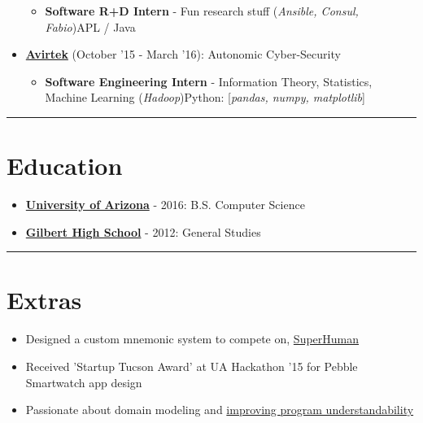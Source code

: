 \documentclass{article}
\begin{document}
\begin{itemize}
\begin{itemize}
\item \textbf{Software R+D Intern} - Fun research stuff (\textit{Ansible, Consul, Fabio})\newline APL / Java
\end{itemize}
\item \href{https://avirtek.com/}{\textbf{Avirtek}} {(October '15 - March '16)}: Autonomic Cyber-Security 
\begin{itemize}
\item \textbf{Software Engineering Intern} - Information Theory, Statistics, Machine Learning (\textit{Hadoop})\newline Python: [\textit{pandas, numpy, matplotlib}]
\end{itemize}
\end{itemize}
\noindent\rule{\linewidth}{1pt}

\raggedright{\section*{Education}}

\begin{itemize}
\item \href{https://www.cs.arizona.edu/}{\textbf{University of Arizona}} - 2016: B.S. Computer Science
\item \href{https://www.gilbertschools.net/gilberthigh}{\textbf{Gilbert High School}} - 2012: General Studies
\end{itemize}
\noindent\rule{\linewidth}{1pt}

\raggedright{\section*{Extras}}

\begin{itemize}
\item Designed a custom mnemonic system to compete on, \href{https://www.youtube.com/watch?v=t65mzlOCDF8}{SuperHuman}
\item Received 'Startup Tucson Award' at UA Hackathon '15 for Pebble Smartwatch app design
\item Passionate about domain modeling and \href{https://www.kaden.dev/pages/musings/software_doesnt_have_clay.html}{improving program understandability}
\end{itemize}
\vspace*{\fill}

\end{document}
